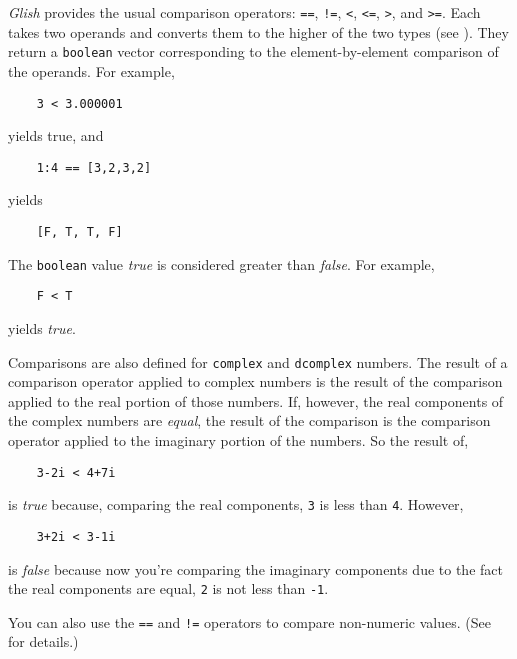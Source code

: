 {\em Glish} provides the usual comparison operators:
\verb+==+,
\verb+!=+,
\verb+<+,
\verb+<=+,
\verb+>+,
and
\verb+>=+.
Each takes two operands and
converts them to the higher of the two types (see ).
They return a {\tt boolean} vector corresponding to the element-by-element
comparison of the operands.
For example,
\begin{verbatim}
    3 < 3.000001
\end{verbatim}
yields true,
and
\begin{verbatim}
    1:4 == [3,2,3,2]
\end{verbatim}
yields
\begin{verbatim}
    [F, T, T, F]
\end{verbatim}
The {\tt boolean} value {\em true} is considered greater than {\em false}.
For example,
\begin{verbatim}
    F < T
\end{verbatim}
yields {\em true}.

Comparisons are also defined for {\tt complex} and {\tt dcomplex} numbers. The
result of a comparison operator applied to complex numbers is the result of the 
comparison applied to the real portion of those numbers.
If, however, the real components of the complex numbers are {\em equal}, the 
result of the comparison is the comparison operator applied to the imaginary
portion of the numbers. So the result of,
\begin{verbatim}
    3-2i < 4+7i
\end{verbatim}
is {\em true} because, comparing the real components, {\tt 3} is less than {\tt 4}.
However,
\begin{verbatim}
    3+2i < 3-1i
\end{verbatim}
is {\em false} because now you're comparing the imaginary components due to
the fact  the real 
components are equal, {\tt 2} is not less than {\tt -1}.

You can also use the \verb+==+ and \verb+!=+ operators to compare non-numeric
values.  (See  for details.)

